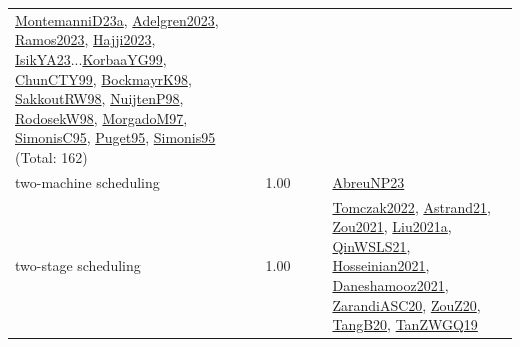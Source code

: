 {\begin{longtable}{p{3cm}r>{\raggedright\arraybackslash}p{6cm}>{\raggedright\arraybackslash}p{6cm}>{\raggedright\arraybackslash}p{8cm}}
\hyperref[detail:MontemanniD23a]{MontemanniD23a}, \hyperref[detail:Adelgren2023]{Adelgren2023}, \hyperref[detail:Ramos2023]{Ramos2023}, \hyperref[detail:Hajji2023]{Hajji2023}, \hyperref[detail:IsikYA23]{IsikYA23}...\hyperref[detail:KorbaaYG99]{KorbaaYG99}, \hyperref[detail:ChunCTY99]{ChunCTY99}, \hyperref[detail:BockmayrK98]{BockmayrK98}, \hyperref[detail:SakkoutRW98]{SakkoutRW98}, \hyperref[detail:NuijtenP98]{NuijtenP98}, \hyperref[detail:RodosekW98]{RodosekW98}, \hyperref[detail:MorgadoM97]{MorgadoM97}, \hyperref[detail:SimonisC95]{SimonisC95}, \hyperref[detail:Puget95]{Puget95}, \hyperref[detail:Simonis95]{Simonis95} (Total: 162)\\
\index{two-machine scheduling}\index{Concepts!two-machine scheduling}two-machine scheduling &  1.00 &  &  & \hyperref[detail:AbreuNP23]{AbreuNP23}\\
\index{two-stage scheduling}\index{Concepts!two-stage scheduling}two-stage scheduling &  1.00 &  &  & \hyperref[detail:Tomczak2022]{Tomczak2022}, \hyperref[detail:Astrand21]{Astrand21}, \hyperref[detail:Zou2021]{Zou2021}, \hyperref[detail:Liu2021a]{Liu2021a}, \hyperref[detail:QinWSLS21]{QinWSLS21}, \hyperref[detail:Hosseinian2021]{Hosseinian2021}, \hyperref[detail:Daneshamooz2021]{Daneshamooz2021}, \hyperref[detail:ZarandiASC20]{ZarandiASC20}, \hyperref[detail:ZouZ20]{ZouZ20}, \hyperref[detail:TangB20]{TangB20}, \hyperref[detail:TanZWGQ19]{TanZWGQ19}\\

\end{longtable}}

